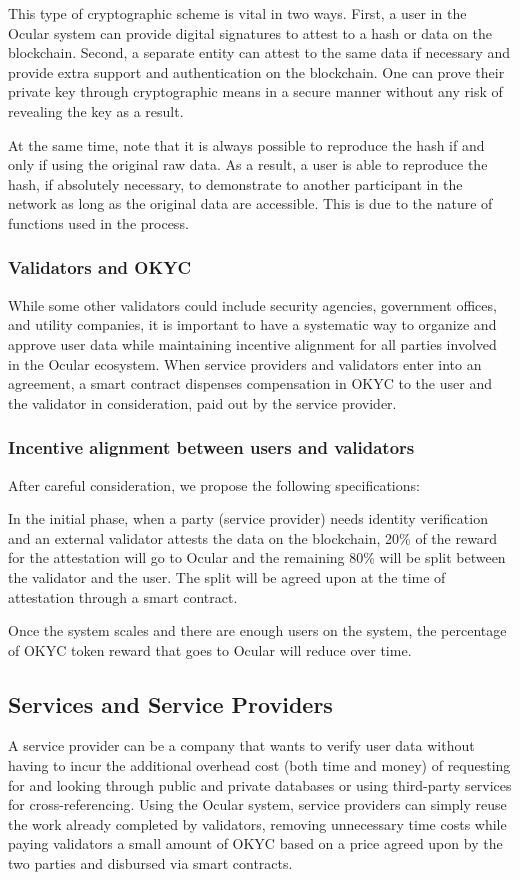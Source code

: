 \documentclass[a4paper]{article}
\let\tempone\itemize
\let\temptwo\enditemize
\renewenvironment{itemize}{\tempone\addtolength{\itemsep}{-5pt}}{\temptwo}
\begin{document}
This type of cryptographic scheme is vital in two ways. First, a user in the Ocular system can provide digital signatures to attest to a hash or data on the blockchain. Second, a separate entity can attest to the same data if necessary and provide extra support and authentication on the blockchain. One can prove their private key through cryptographic means in a secure manner without any risk of revealing the key as a result.

At the same time, note that it is always possible to reproduce the hash if and only if using the original raw data. As a result, a user is able to reproduce the hash, if absolutely necessary, to demonstrate to another participant in the network as long as the original data are accessible. This is due to the nature of functions used in the process.

\subsubsection*{Validators and OKYC}
While some other validators could include security agencies, government offices, and utility companies, it is important to have a systematic way to organize and approve user data while maintaining incentive alignment for all parties involved in the Ocular ecosystem. When service providers and validators enter into an agreement, a smart contract dispenses compensation in OKYC to the user and the validator in consideration, paid out by the service provider. 
\subsubsection* {Incentive alignment between users and validators}
After careful consideration, we propose the following specifications:
\begin{itemize}
\item In the initial phase, when a party (service provider) needs identity verification and an external validator attests the data on the blockchain, 20\% of the reward for the attestation will go to Ocular and the remaining 80\% will be split between the validator and the user. The split will be agreed upon at the time of attestation through a smart contract. 
\item Once the system scales and there are enough users on the system, the percentage of OKYC token reward that goes to Ocular will reduce over time. 
\end{itemize}

\subsection{Services and Service Providers}
A service provider can be a company that wants to verify user data without having to incur the additional overhead cost (both time and money) of requesting for and looking through public and private databases or using third-party services for cross-referencing. Using the Ocular system, service providers can simply reuse the work already completed by validators, removing unnecessary time costs while paying validators a small amount of OKYC based on a price agreed upon by the two parties and disbursed via smart contracts.
\end{document}
